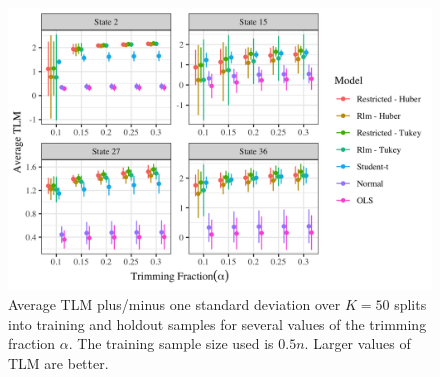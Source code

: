 \documentclass[ba]{imsart}
\begin{document}
\begin{figure}[t]
\centering
\includegraphics[width=6in]{tlm_base_Student-tbyTrimming.png}
\caption{Average TLM plus/minus one standard deviation over $K = 50$ splits into training and holdout samples for several values of the trimming fraction $\alpha$. The training sample size used is $0.5n$.  Larger values of TLM are better.}
\label{fig:tlmbyAlpha}
\end{figure}

%
\end{document}
